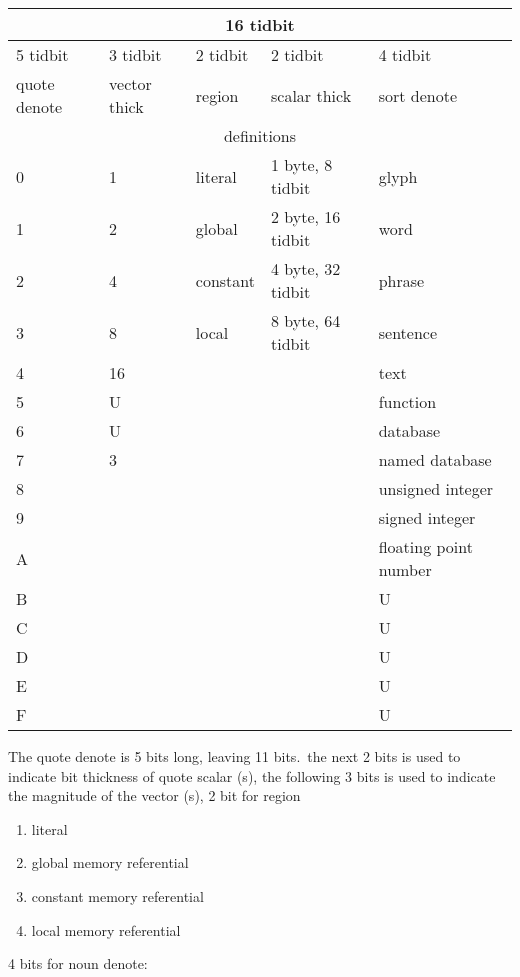 \documentclass[12pt]{report}
\begin{document}
\begin{tabular}{*{5}{l}}
\toprule
\multicolumn{5}{|c|}{16 tidbit} \\
\midrule
5 tidbit     & 3 tidbit            & 2 tidbit        & 2 tidbit & 4 tidbit \\
\midrule
quote denote & vector thick & region & scalar thick & sort denote \\
\midrule
\midrule
\multicolumn{5}{|c|}{definitions}\\
\bottomrule
0            & 1 & literal  & 1 byte, 8 tidbit                & glyph \\
1            & 2 & global   & 2 byte, 16 tidbit               & word \\
2            & 4 & constant & 4 byte, 32 tidbit                & phrase \\
3            & 8 & local    & 8 byte, 64 tidbit               & sentence \\
4            & 16 &                                 & & text \\
5            & U  &                                 & & function \\
6            & U  &                                 & & database \\
7            & 3  &                                 & & named database \\
8 & & & & unsigned integer \\
9 & & & & signed integer \\
A & & & & floating point number \\
B & & & & U \\
C & & & & U \\
D & & & & U \\
E & & & & U \\
F & & & & U \\
\bottomrule
\end{tabular}
The quote denote is 5 bits long, leaving 11 bits.\
the next 2 bits is used to indicate bit thickness of quote scalar (s),
the following 3 bits is used to indicate the magnitude of the vector (s),
2 bit for region
\begin{enumerate}
  \setcounter{enumi}{0}
  \item literal
  \item global memory referential
  \item constant memory referential
  \item local memory referential
\end{enumerate}
4 bits for noun denote:
\end{document}
